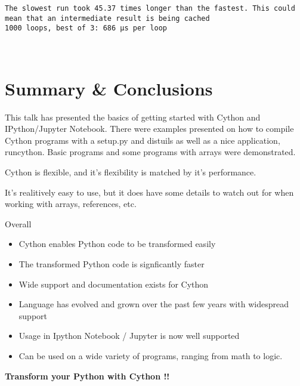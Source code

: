 \documentclass{article}
\begin{document}
    \begin{Verbatim}[commandchars=\\\{\}]
The slowest run took 45.37 times longer than the fastest. This could mean that an intermediate result is being cached 
1000 loops, best of 3: 686 µs per loop
    \end{Verbatim}

    \begin{center}
    \end{center}
    { \hspace*{\fill} \\}
    
    \section{Summary \& Conclusions}\label{summary-conclusions}

This talk has presented the basics of getting started with Cython and
IPython/Jupyter Notebook. There were examples presented on how to
compile Cython programs with a setup.py and distuils as well as a nice
application, runcython. Basic programs and some programs with arrays
were demonstrated.

Cython is flexible, and it's flexibility is matched by it's performance.

It's realitively easy to use, but it does have some details to watch out
for when working with arrays, references, etc.

Overall

\begin{itemize}
\itemsep1pt\parskip0pt
\item
  Cython enables Python code to be transformed easily
\item
  The transformed Python code is signficantly faster
\item
  Wide support and documentation exists for Cython
\item
  Language has evolved and grown over the past few years with widespread
  support
\item
  Usage in Ipython Notebook / Jupyter is now well supported
\item
  Can be used on a wide variety of programs, ranging from math to logic.
\end{itemize}

\textbf{Transform your Python with Cython !! }
\end{document}
